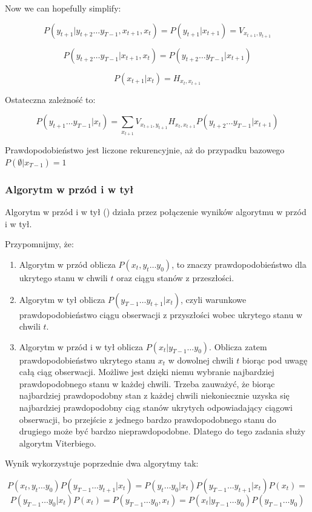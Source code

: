 Now we can hopefully simplify:

$$P(y_{t+1} | y_{t+2} \dots y_{T-1}, x_{t+1}, x_t) = P(y_{t+1} | x_{t+1}) = V_{x_{t+1},y_{t+1}}$$

$$P(y_{t+2} \dots y_{T-1} | x_{t+1}, x_t) = P(y_{t+2} \dots y_{T-1} | x_{t+1})$$

$$P(x_{t+1} | x_t) = H_{x_t,x_{t+1}}$$

Ostateczna zależność to:

$$P(y_{t+1} \dots y_{T-1} | x_t) =  \sum_{x_{t+1}} V_{x_{t+1},y_{t+1}} H_{x_t,x_{t+1}} P(y_{t+2} \dots y_{T-1} | x_{t+1})$$

Prawdopodobieństwo jest liczone rekurencyjnie, aż do przypadku bazowego $P(\emptyset | x_{T-1}) = 1$

\subsubsection{Algorytm w przód i w tył}
Algorytm w przód i w tył () działa przez połączenie wyników algorytmu w przód i w tył.

Przypomnijmy, że:

\begin{enumerate}
    \item Algorytm w przód oblicza $P(x_t, y_t \dots y_0)$, to znaczy prawdopodobieństwo dla ukrytego stanu w chwili $t$ oraz ciągu stanów z przeszłości.
    \item Algorytm w tył oblicza $P(y_{T-1} \dots y_{t+1} | x_t)$, czyli warunkowe prawdopodobieństwo ciągu obserwacji z przyszłości wobec ukrytego stanu w chwili $t$.
    \item Algorytm w przód i w tył oblicza $P(x_t | y_{T-1} \dots y_0)$. Oblicza zatem prawdopodobieństwo ukrytego stanu $x_t$ w dowolnej chwili $t$ biorąc pod uwagę całą ciąg obserwacji. Możliwe jest dzięki niemu wybranie najbardziej prawdopodobnego stanu w każdej chwili. Trzeba zauważyć, że biorąc najbardziej prawdopodobny stan z każdej chwili niekoniecznie uzyska się najbardziej prawdopodobny ciąg stanów ukrytych odpowiadający ciągowi obserwacji, bo przejście z jednego bardzo prawdopodobnego stanu do drugiego może być bardzo nieprawdopodobne. Dlatego do tego zadania służy algorytm Viterbiego.
\end{enumerate}

Wynik  wykorzystuje poprzednie dwa algorytmy tak:

$$P(x_t, y_t \dots y_0) P(y_{T-1} \dots y_{t+1} | x_t) = P(y_t \dots y_0 | x_t) P(y_{T-1} \dots y_{t+1} | x_t) P(x_t) = $$
$$P(y_{T-1} \dots y_0 | x_t) P(x_t) = P(y_{T-1} \dots y_0, x_t) = P(x_t | y_{T-1} \dots y_0) P(y_{T-1} \dots y_0)$$

